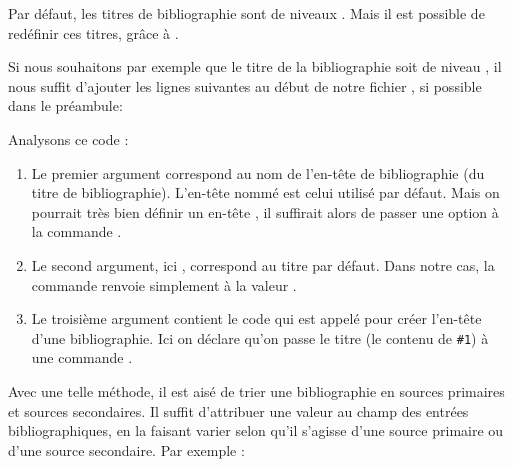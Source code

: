 Par défaut, les titres de bibliographie sont de niveaux . Mais il est possible de redéfinir ces titres, grâce à  .

Si nous souhaitons par exemple que le titre de la bibliographie soit de niveau , il nous suffit d'ajouter les lignes suivantes au début de notre fichier , si possible dans le préambule:


Analysons ce code :
\begin{enumerate}
\item Le premier argument correspond au nom de l'en-tête de bibliographie (du titre de bibliographie). L'en-tête nommé  est celui utilisé par défaut. Mais on pourrait très bien définir un en-tête , il suffirait alors de passer une option  à la commande .


\item Le second argument, ici , correspond au titre par défaut. Dans notre cas, la commande  renvoie simplement à la valeur .
\item Le troisième argument contient le code qui est appelé pour créer l'en-tête d'une bibliographie. Ici on déclare qu'on passe le titre (le contenu de \verb|#1|) à une commande .
\end{enumerate}


Avec une telle méthode, il est aisé de trier une bibliographie en sources primaires et sources secondaires. Il suffit d'attribuer une valeur au champ  des entrées bibliographiques, en la faisant varier selon qu'il s'agisse d'une source primaire ou d'une source secondaire.
Par exemple :

